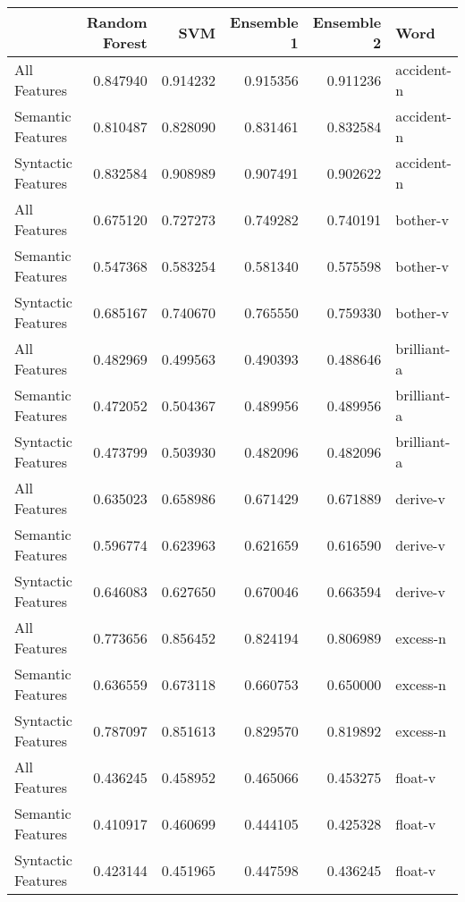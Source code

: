 \begin{tabular}{lrrrrl}
\toprule
{} &  Random Forest &       SVM &  Ensemble 1 &  Ensemble 2 &         Word \\
\midrule
All Features       &       0.847940 &  0.914232 &    0.915356 &    0.911236 &   accident-n \\
Semantic Features  &       0.810487 &  0.828090 &    0.831461 &    0.832584 &   accident-n \\
Syntactic Features &       0.832584 &  0.908989 &    0.907491 &    0.902622 &   accident-n \\
All Features       &       0.675120 &  0.727273 &    0.749282 &    0.740191 &     bother-v \\
Semantic Features  &       0.547368 &  0.583254 &    0.581340 &    0.575598 &     bother-v \\
Syntactic Features &       0.685167 &  0.740670 &    0.765550 &    0.759330 &     bother-v \\
All Features       &       0.482969 &  0.499563 &    0.490393 &    0.488646 &  brilliant-a \\
Semantic Features  &       0.472052 &  0.504367 &    0.489956 &    0.489956 &  brilliant-a \\
Syntactic Features &       0.473799 &  0.503930 &    0.482096 &    0.482096 &  brilliant-a \\
All Features       &       0.635023 &  0.658986 &    0.671429 &    0.671889 &     derive-v \\
Semantic Features  &       0.596774 &  0.623963 &    0.621659 &    0.616590 &     derive-v \\
Syntactic Features &       0.646083 &  0.627650 &    0.670046 &    0.663594 &     derive-v \\
All Features       &       0.773656 &  0.856452 &    0.824194 &    0.806989 &     excess-n \\
Semantic Features  &       0.636559 &  0.673118 &    0.660753 &    0.650000 &     excess-n \\
Syntactic Features &       0.787097 &  0.851613 &    0.829570 &    0.819892 &     excess-n \\
All Features       &       0.436245 &  0.458952 &    0.465066 &    0.453275 &      float-v \\
Semantic Features  &       0.410917 &  0.460699 &    0.444105 &    0.425328 &      float-v \\
Syntactic Features &       0.423144 &  0.451965 &    0.447598 &    0.436245 &      float-v \\

\end{tabular}
